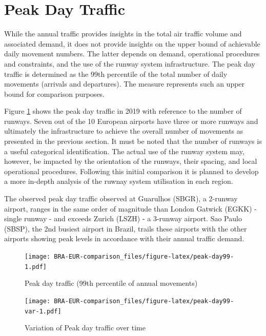 \documentclass[
]{book}
\begin{document}
\hypertarget{peak-day-traffic}{%
\section{Peak Day Traffic}\label{peak-day-traffic}}

While the annual traffic provides insights in the total air traffic volume and associated demand, it does not provide insights on the upper bound of achievable daily movement numbers.
The latter depends on demand, operational procedures and constraints, and the use of the runway system infrastructure.
The peak day traffic is determined as the 99th percentile of the total number of daily movements (arrivals and departures).
The measure represents such an upper bound for comparison purposes.

Figure \ref{fig:peak-day99} shows the peak day traffic in 2019 with reference to the number of runways.
Seven out of the 10 European airports have three or more runways and ultimately the infrastructure to achieve the overall number of movements as presented in the previous section.
It must be noted that the number of runways is a useful categorical identification.
The actual use of the runway system may, however, be impacted by the orientation of the runways, their spacing, and local operational procedures.
Following this initial comparison it is planned to develop a more in-depth analysis of the ruwnay system utilisation in each region.

The observed peak day traffic observed at Guarulhos (SBGR), a 2-runway airport, ranges in the same order of magnitude than London Gatwick (EGKK) - single runway - and exceeds Zurich (LSZH) - a 3-runway airport.
Sao Paulo (SBSP), the 2nd busiest airport in Brazil, trails these airports with the other airports showing peak levels in accordance with their annual traffic demand.



\begin{figure}
\centering
\texttt{[image: BRA-EUR-comparison\_files/figure-latex/peak-day99-1.pdf]}
\caption{\label{fig:peak-day99}Peak day traffic (99th percentile of annual movements)}
\end{figure}



\begin{figure}
\centering
\texttt{[image: BRA-EUR-comparison\_files/figure-latex/peak-day99-var-1.pdf]}
\caption{\label{fig:peak-day99-var}Variation of Peak day traffic over time}
\end{figure}
\end{document}
